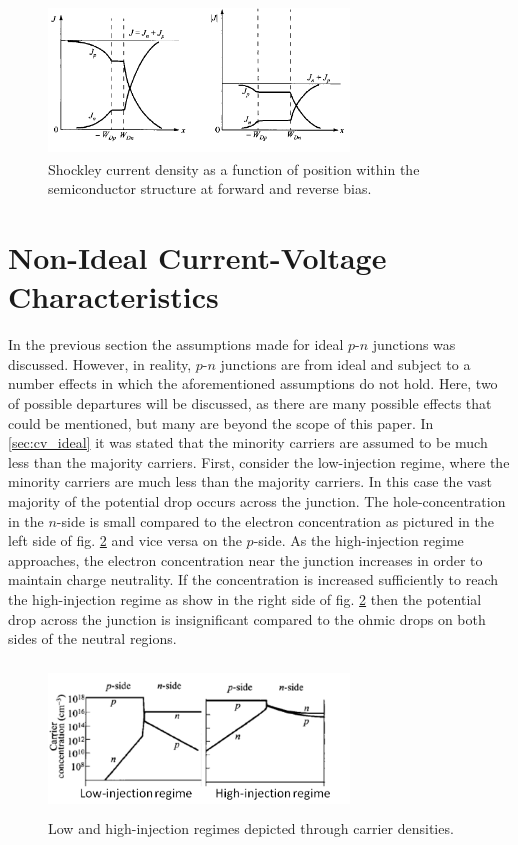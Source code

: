 \documentclass[%
 reprint,
 amsmath,amssymb,
 aps,
pra,
floatfix,
]{revtex4-1}
\begin{document}
%
\begin{figure}[h!]
    \centering
    \includegraphics[height=4cm,width=8cm]{figs/schokley_current_reverse_forward}
    \caption{Shockley current density as a function of position within the semiconductor structure at forward and reverse bias.}
    \label{fig:fig5}
\end{figure}

\section{Non-Ideal Current-Voltage Characteristics}
In the previous section the assumptions made for ideal $p$-$n$ junctions was discussed. However,
in reality, $p$-$n$ junctions are from ideal and subject to a number effects in which the aforementioned assumptions
do not hold. Here, two of possible departures will be discussed, as there are many possible effects that could be mentioned, but many
are beyond the scope of this paper. In \ref{sec:cv_ideal} it was stated that the minority carriers are assumed to be much less than the
majority carriers. First, consider the low-injection regime, where the minority carriers are much less than the majority carriers. In this case
the vast majority of the potential drop occurs across the junction. The hole-concentration in the $n$-side is small compared to the electron concentration
as pictured in the left side of fig. \ref{fig:fig6} and vice versa on the $p$-side. As the high-injection regime approaches, the electron
concentration near the junction increases in order to maintain charge neutrality. If the concentration is increased sufficiently to reach the high-injection regime
as show in the right side of fig. \ref{fig:fig6} then the potential drop across the junction is insignificant compared to the ohmic drops on both sides of the 
neutral regions. 
%
\begin{figure}[h!]
    \centering
    \includegraphics[height=4cm,width=8cm]{figs/high_low_injection}
    \caption{Low and high-injection regimes depicted through carrier densities.}
    \label{fig:fig6}
\end{figure}
\end{document}
